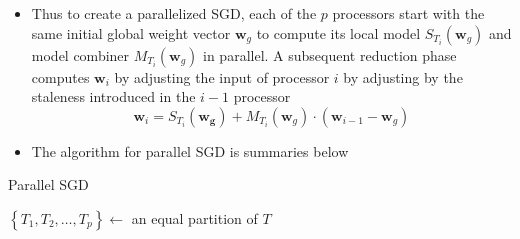 \begin{itemize}
    \item Thus to create a parallelized SGD, each of the $p$ processors start with the same initial global weight vector $\bm{w}_{g}$ to compute its local model $S_{T_i} \left( \bm{w}_{g} \right)$ and model combiner $M_{T_{i}} \left( \bm{w}_{g} \right)$ in parallel. A subsequent reduction phase computes $\bm{w}_{i}$ by adjusting the input of processor $i$ by adjusting by the staleness introduced in the $i-1$ processor
    \[
        \bm{w}_{i} = S_{T_{i}} \left( \bm{w_{g}} \right) + M_{T_{i}} \left( \bm{w}_{g} \right) \cdot \left( \bm{w}_{i-1} - \bm{w}_{g} \right)
    \]
    \item The algorithm for parallel SGD is summaries below
\end{itemize}

\begin{algorithm}[ht!!!]
    \caption{Parallel SGD}
    \label{alg:parallel-SGD}
    \footnotesize
    \SetAlgoLined
        \BlankLine
        $\left\lbrace T_{1} , T_{2}, \ldots , T_{p} \right\rbrace \gets$ an equal partition of $T$\;
        \BlankLine
    \end{algorithm}